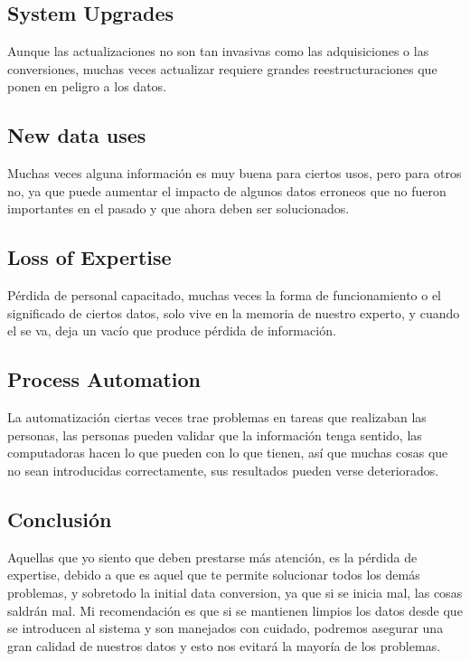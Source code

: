 \documentclass{article}
\begin{document}
\subsection{System Upgrades}
Aunque las actualizaciones no son tan invasivas como las adquisiciones o las conversiones, muchas veces actualizar requiere grandes reestructuraciones que ponen en peligro a los datos.
\subsection{New data uses}
Muchas veces alguna información es muy buena para ciertos usos, pero para otros no, ya que puede aumentar el impacto de algunos datos erroneos que no fueron importantes en el pasado y que ahora deben ser solucionados.
\subsection{Loss of Expertise}
Pérdida de personal capacitado, muchas veces la forma de funcionamiento o el significado de ciertos datos, solo vive en la memoria de nuestro experto, y cuando el se va, deja un vacío que produce pérdida de información.
\subsection{Process Automation}
La automatización ciertas veces trae problemas en tareas que realizaban las personas, las personas pueden validar que la información tenga sentido, las computadoras hacen lo que pueden con lo que tienen, así que muchas cosas que no sean introducidas correctamente, sus resultados pueden verse deteriorados.

\subsection{Conclusión}
Aquellas que yo siento que deben prestarse más atención, es la pérdida de expertise, debido a que es aquel que te permite solucionar todos los demás problemas, y sobretodo la initial data conversion, ya que si se inicia mal, las cosas saldrán mal.
\medbreak
Mi recomendación es que si se mantienen limpios los datos desde que se introducen al sistema y son manejados con cuidado, podremos asegurar una gran calidad de nuestros datos y esto nos evitará la mayoría de los problemas.
\end{document}
